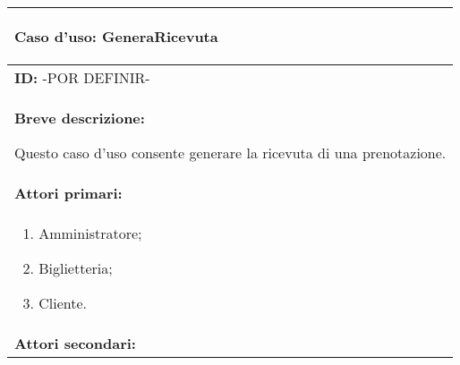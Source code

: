 \documentclass{article}
\begin{document}
\begin{table}[t]
    \centering
    \begin{tabular}{|p{\linewidth}|}
        \hline
        \cellcolor{gray!100}
        \color{white}
        \begin{center}
            \textbf{Caso d'uso:} GeneraRicevuta
        \end{center} \\
        \hline
        \textbf{ID:} -POR DEFINIR- \\
        \hline
        \cellcolor{gray!20}
        \textbf{Breve descrizione:}

        Questo caso d'uso consente generare la ricevuta di una prenotazione. \\
        \hline
        \textbf{Attori primari:} \\
        \begin{minipage}{\linewidth}
            \begin{enumerate}[noitemsep]
                \item Amministratore;
                \item Biglietteria;
                \item Cliente.
            \end{enumerate}
        \end{minipage}
        \vspace{0pt} \\
        \hline
        \textbf{Attori secondari:}


\end{tabular}
\end{table}
\end{document}
